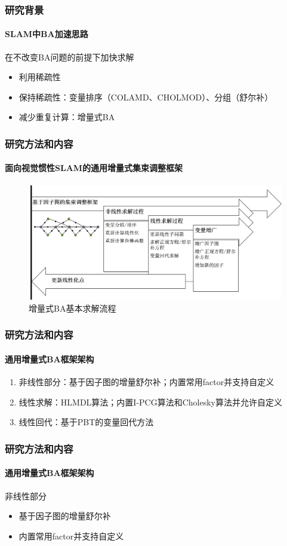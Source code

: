 \documentclass{beamer}
\begin{document}
\begin{frame}
    \frametitle{研究背景}
    \framesubtitle{SLAM中BA加速思路}

    在不改变BA问题的前提下加快求解
    \begin{itemize}
        \item 利用稀疏性
        \item 保持稀疏性：变量排序（COLAMD、CHOLMOD）、分组（舒尔补）
        \item 减少重复计算：增量式BA
    \end{itemize}
\end{frame}

\begin{frame}
    \frametitle{研究方法和内容}
    \framesubtitle{面向视觉惯性SLAM的通用增量式集束调整框架}
    \begin{figure}[h]
        \includegraphics[width=.8\textwidth]{figs/framework.png}
        \caption{增量式BA基本求解流程}
        \label{fig:framework}
    \end{figure}
\end{frame}

\begin{frame}
    \frametitle{研究方法和内容}
    \framesubtitle{通用增量式BA框架架构}
    \begin{enumerate}
        \item 非线性部分：基于因子图的增量舒尔补；内置常用factor并支持自定义
        \item 线性求解：HLMDL算法；内置I-PCG算法和Cholesky算法并允许自定义
        \item 线性回代：基于PBT的变量回代方法
    \end{enumerate}
\end{frame}

\begin{frame}
    \frametitle{研究方法和内容}
    \framesubtitle{通用增量式BA框架架构}

    非线性部分
    \begin{itemize}
        \item 基于因子图的增量舒尔补
        \item 内置常用factor并支持自定义
    \end{itemize}
\end{frame}
\end{document}
